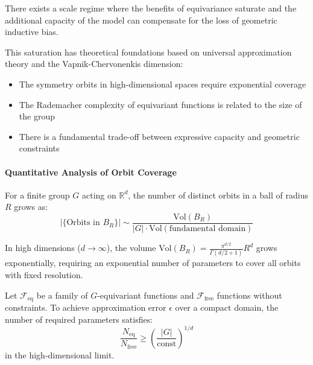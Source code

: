 \begin{hypothesis}
There exists a scale regime where the benefits of equivariance saturate and the additional capacity of the model can compensate for the loss of geometric inductive bias.
\end{hypothesis}

This saturation has theoretical foundations based on universal approximation theory and the Vapnik-Chervonenkis dimension:

\begin{itemize}
\item The symmetry orbits in high-dimensional spaces require exponential coverage
\item The Rademacher complexity of equivariant functions is related to the size of the group
\item There is a fundamental trade-off between expressive capacity and geometric constraints
\end{itemize}

\paragraph{Quantitative Analysis of Orbit Coverage}

For a finite group $G$ acting on $\mathbb{R}^d$, the number of distinct orbits in a ball of radius $R$ grows as:
\begin{equation}
|\{\text{Orbits in } B_R\}| \sim \frac{\text{Vol}(B_R)}{|G| \cdot \text{Vol}(\text{fundamental domain})}
\end{equation}

In high dimensions ($d \to \infty$), the volume $\text{Vol}(B_R) = \frac{\pi^{d/2}}{\Gamma(d/2 + 1)} R^d$ grows exponentially, requiring an exponential number of parameters to cover all orbits with fixed resolution.

\begin{proposition}
Let $\mathcal{F}_{\text{eq}}$ be a family of $G$-equivariant functions and $\mathcal{F}_{\text{free}}$ functions without constraints. To achieve approximation error $\epsilon$ over a compact domain, the number of required parameters satisfies:
\begin{equation}
\frac{N_{\text{eq}}}{N_{\text{free}}} \geq \left(\frac{|G|}{\text{const}}\right)^{1/d}
\end{equation}
in the high-dimensional limit.
\end{proposition}

